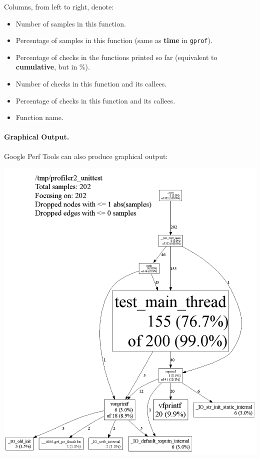 \documentclass[a4paper]{report}
\begin{document}
Columns, from left to right, denote:
\begin{itemize}
\item  Number of samples in this function.
\item  Percentage of samples in this function (same as {\bf time} in {\tt gprof}).
\item  Percentage of checks in the functions printed so far (equivalent to {\bf cumulative}, but in \%).
\item     Number of checks in this function and its callees.
\item     Percentage of checks in this function and its callees.
\item    Function name.
\end{itemize}

\paragraph{Graphical Output.} Google Perf Tools can also produce graphical output:

\begin{center}
    \includegraphics[scale=0.3]{images/pprof-test-big.png}
\end{center}
\end{document}
